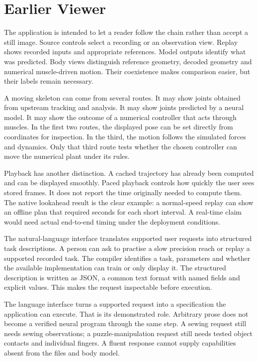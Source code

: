 \section{Earlier Viewer}

The application is intended to let a reader follow the chain rather than accept a still image. Source controls select a recording or an observation view. Replay shows recorded inputs and appropriate references. Model outputs identify what was predicted. Body views distinguish reference geometry, decoded geometry and numerical muscle-driven motion. Their coexistence makes comparison easier, but their labels remain necessary.

A moving skeleton can come from several routes. It may show joints obtained from upstream tracking and analysis. It may show joints predicted by a neural model. It may show the outcome of a numerical controller that acts through muscles. In the first two routes, the displayed pose can be set directly from coordinates for inspection. In the third, the motion follows the simulated forces and dynamics. Only that third route tests whether the chosen controller can move the numerical plant under its rules.

Playback has another distinction. A cached trajectory has already been computed and can be displayed smoothly. Paced playback controls how quickly the user sees stored frames. It does not report the time originally needed to compute them. The native lookahead result is the clear example: a normal-speed replay can show an offline plan that required seconds for each short interval. A real-time claim would need actual end-to-end timing under the deployment conditions.

The natural-language interface translates supported user requests into structured task descriptions. A person can ask to practise a slow precision reach or replay a supported recorded task. The compiler identifies a task, parameters and whether the available implementation can train or only display it. The structured description is written as JSON, a common text format with named fields and explicit values. This makes the request inspectable before execution.

The language interface turns a supported request into a specification the application can execute. That is its demonstrated role. Arbitrary prose does not become a verified neural program through the same step. A sewing request still needs sewing observations; a puzzle-manipulation request still needs tested object contacts and individual fingers. A fluent response cannot supply capabilities absent from the files and body model.

